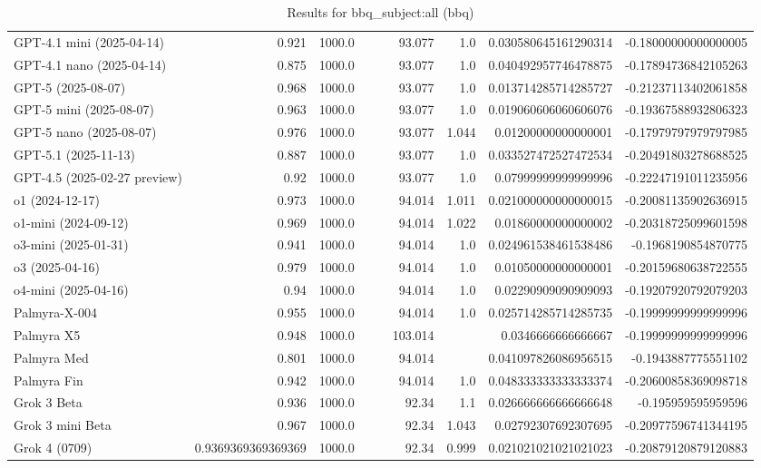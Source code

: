 \begin{table}[htp]
{\begin{tabular}{lrrrrrrrr}
GPT-4.1 mini (2025-04-14) & 0.921 & 1000.0 &  &  & 93.077 & 1.0 & 0.030580645161290314 & -0.18000000000000005 \\
GPT-4.1 nano (2025-04-14) & 0.875 & 1000.0 &  &  & 93.077 & 1.0 & 0.040492957746478875 & -0.17894736842105263 \\
GPT-5 (2025-08-07) & 0.968 & 1000.0 &  &  & 93.077 & 1.0 & 0.013714285714285727 & -0.21237113402061858 \\
GPT-5 mini (2025-08-07) & 0.963 & 1000.0 &  &  & 93.077 & 1.0 & 0.019060606060606076 & -0.19367588932806323 \\
GPT-5 nano (2025-08-07) & 0.976 & 1000.0 &  &  & 93.077 & 1.044 & 0.01200000000000001 & -0.17979797979797985 \\
GPT-5.1 (2025-11-13) & 0.887 & 1000.0 &  &  & 93.077 & 1.0 & 0.033527472527472534 & -0.20491803278688525 \\
GPT-4.5 (2025-02-27 preview) & 0.92 & 1000.0 &  &  & 93.077 & 1.0 & 0.07999999999999996 & -0.22247191011235956 \\
o1 (2024-12-17) & 0.973 & 1000.0 &  &  & 94.014 & 1.011 & 0.021000000000000015 & -0.20081135902636915 \\
o1-mini (2024-09-12) & 0.969 & 1000.0 &  &  & 94.014 & 1.022 & 0.01860000000000002 & -0.20318725099601598 \\
o3-mini (2025-01-31) & 0.941 & 1000.0 &  &  & 94.014 & 1.0 & 0.024961538461538486 & -0.1968190854870775 \\
o3 (2025-04-16) & 0.979 & 1000.0 &  &  & 94.014 & 1.0 & 0.01050000000000001 & -0.20159680638722555 \\
o4-mini (2025-04-16) & 0.94 & 1000.0 &  &  & 94.014 & 1.0 & 0.02290909090909093 & -0.19207920792079203 \\
Palmyra-X-004 & 0.955 & 1000.0 &  &  & 94.014 & 1.0 & 0.025714285714285735 & -0.19999999999999996 \\
Palmyra X5 & 0.948 & 1000.0 &  &  & 103.014 &  & 0.0346666666666667 & -0.19999999999999996 \\
Palmyra Med & 0.801 & 1000.0 &  &  & 94.014 &  & 0.041097826086956515 & -0.1943887775551102 \\
Palmyra Fin & 0.942 & 1000.0 &  &  & 94.014 & 1.0 & 0.048333333333333374 & -0.20600858369098718 \\
Grok 3 Beta & 0.936 & 1000.0 &  &  & 92.34 & 1.1 & 0.026666666666666648 & -0.195959595959596 \\
Grok 3 mini Beta & 0.967 & 1000.0 &  &  & 92.34 & 1.043 & 0.02792307692307695 & -0.20977596741344195 \\
Grok 4 (0709) & 0.9369369369369369 & 1000.0 &  &  & 92.34 & 0.999 & 0.021021021021021023 & -0.20879120879120883 \\
\bottomrule
\end{tabular}}
\caption{Results for bbq_subject:all (bbq)}
\label{fig:bbq_subject:all (bbq)}
\end{table}